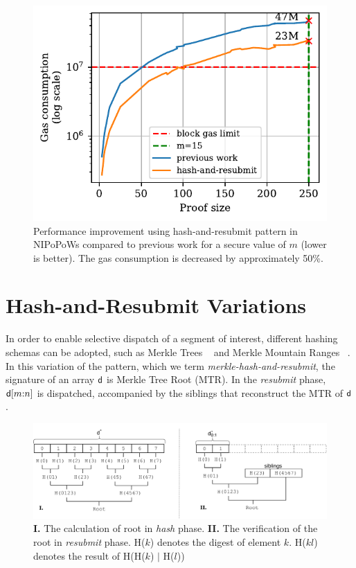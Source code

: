 

\begin{figure}[H]
    \begin{center}
        \includegraphics[width=0.6\columnwidth]{figures/har-nipopows.pdf}
    \end{center}
    \caption{Performance improvement using hash-and-resubmit pattern in
        NIPoPoWs compared to previous work for a secure value of $m$ (lower is
        better). The gas consumption is decreased by approximately 50\%.}
    \label{fig:har-nipopow}
\end{figure}

\section{Hash-and-Resubmit Variations}
In order to enable selective dispatch of a segment of interest, different
hashing schemas can be adopted, such as Merkle Trees ~\cite{merkle} and Merkle Mountain
Ranges ~\cite{mmr-1, mmr-2}. In this variation of the pattern, which we term
\emph{merkle-hash-and-resubmit}, the signature of an array $\mathsf{d}$ is
Merkle Tree Root (MTR). In the \emph{resubmit} phase, $\mathsf{d}[m{:}n]$ is
dispatched, accompanied by the siblings that reconstruct the MTR of
$\mathsf{d}$.

\begin{figure}[h]
    \begin{center}
        \includegraphics[width=1\linewidth]{figures/merkle-har.pdf}
    \end{center}
    \caption{\textbf{I.} The calculation of root in \emph{hash} phase.
    \textbf{II.} The verification of the root in \emph{resubmit} phase.
    \textsf{H}($k$) denotes the digest of element $k$. \textsf{H}($kl$) denotes the
    result of \textsf{H}(\textsf{H}($k$) $|$ \textsf{H}($l$))}
    \label{fig:merkle-har}
\end{figure}

